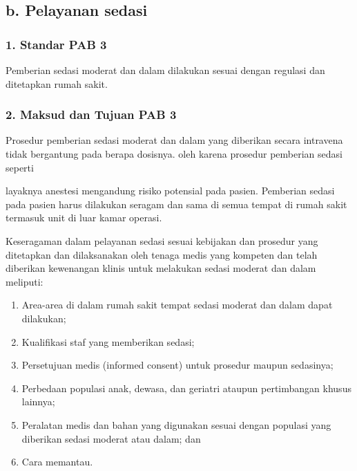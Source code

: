 \documentclass[
]{book}
\providecommand{\tightlist}{%
  \setlength{\itemsep}{0pt}\setlength{\parskip}{0pt}}
\begin{document}
\hypertarget{b.-pelayanan-sedasi}{%
\subsection*{b. Pelayanan sedasi}\label{b.-pelayanan-sedasi}}

\hypertarget{standar-pab-3}{%
\subsubsection*{1. Standar PAB 3}\label{standar-pab-3}}

Pemberian sedasi moderat dan dalam dilakukan sesuai dengan regulasi dan ditetapkan rumah sakit.

\hypertarget{maksud-dan-tujuan-pab-3}{%
\subsubsection*{2. Maksud dan Tujuan PAB 3}\label{maksud-dan-tujuan-pab-3}}

Prosedur pemberian sedasi moderat dan dalam yang diberikan secara intravena tidak bergantung pada berapa dosisnya. oleh karena prosedur pemberian sedasi seperti

layaknya anestesi mengandung risiko potensial pada pasien. Pemberian sedasi pada pasien harus dilakukan seragam dan sama di semua tempat di rumah sakit termasuk unit di luar kamar operasi.

Keseragaman dalam pelayanan sedasi sesuai kebijakan dan prosedur yang ditetapkan dan dilaksanakan oleh tenaga medis yang kompeten dan telah diberikan kewenangan klinis untuk melakukan sedasi moderat dan dalam meliputi:

\begin{enumerate}
\def\labelenumi{\alph{enumi}.}
\tightlist
\item
  Area-area di dalam rumah sakit tempat sedasi moderat dan dalam dapat dilakukan;
\item
  Kualifikasi staf yang memberikan sedasi;
\item
  Persetujuan medis (informed consent) untuk prosedur maupun sedasinya;
\item
  Perbedaan populasi anak, dewasa, dan geriatri ataupun pertimbangan khusus lainnya;
\item
  Peralatan medis dan bahan yang digunakan sesuai dengan populasi yang diberikan sedasi moderat atau dalam; dan
\item
  Cara memantau.
\end{enumerate}
\end{document}
